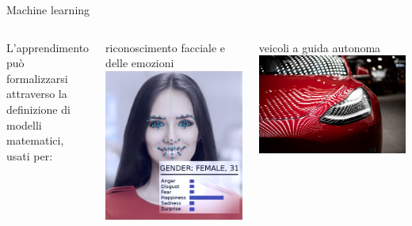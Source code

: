 \documentclass{beamer}
\begin{document}
\begin{frame}{Machine learning}
\begin{columns}
            L'apprendimento può formalizzarsi attraverso la definizione di modelli matematici, usati per:
            \begin{columns}
                riconoscimento facciale e delle emozioni
                \includegraphics[width=\columnwidth]{gfx/Visage_Technologies_Face_Tracking_and_Analysis.png}
            \end{columns}

            \begin{columns}
                veicoli a guida autonoma
                \includegraphics[width=\columnwidth]{gfx/tesla.jpg}
            \end{columns}


\end{columns}
\end{frame}
\end{document}
